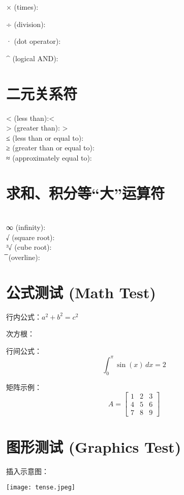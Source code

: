 \documentclass[a4paper,12pt]{article}
\begin{document}
    × (times):\times

    ÷ (division):\div

    · (dot operator):\dot

    ^ (logical AND):\wedge

    \section*{二元关系符}
    < (less than):< \\
    > (greater than): > \\
    ≤ (less than or equal to): \le \\
    ≥ (greater than or equal to):\ge \\
    ≈ (approximately equal to):\approx \\

    \section*{求和、积分等“大”运算符} \\[0.5]
    ∞ (infinity):\infty \\[0.5]
    √ (square root):\sqrt{} \\[4]
    ³√ (cube root):\sqrt[3]{} \\[0.5]
    ̅ (overline): \\[0.5]

    \section*{公式测试 (Math Test)}
    行内公式：$a^2 + b^2 = c^2$

    次方根：

    行间公式：
    \[
        \int_0^{\pi} \sin(x)\, dx = 2
    \]

    矩阵示例：
    \[
        A = \begin{bmatrix}
                1 & 2 & 3 \\
                4 & 5 & 6 \\
                7 & 8 & 9
        \end{bmatrix}
    \]

    \section*{图形测试 (Graphics Test)}
    插入示意图：

    \texttt{[image: tense.jpeg]}
\end{document}

